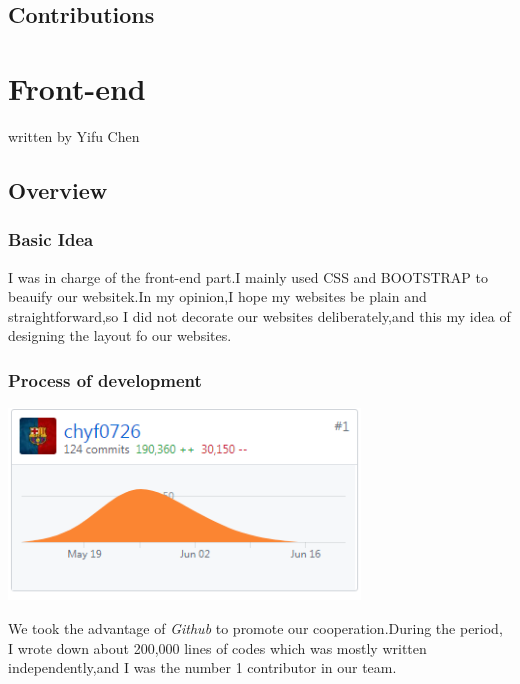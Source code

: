 \documentclass[10pt,twoside,a4paper,titlepage]{article}
\begin{document}
\subsection{Contributions}


	\newpage
\section{Front-end}
written by Yifu Chen
	
	\subsection{Overview}
	
	\subsubsection{Basic Idea}
	
	I was in charge of the front-end part.I mainly used CSS and BOOTSTRAP to beauify our websitek.In my opinion,I hope my websites be plain and straightforward,so I did not decorate our websites deliberately,and this my idea of designing the layout fo our websites.
	
	\subsubsection{Process of development}
	
	\includegraphics[width=0.7\textwidth]{cyf/contribution.PNG}
	
	We took the advantage of \emph{Github} to promote our cooperation.During the period, I wrote down about 200,000 lines of codes which was mostly written independently,and I was the number 1 contributor in our team.
	
\end{document}
